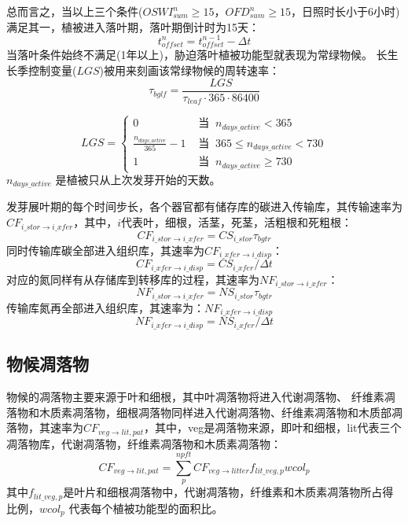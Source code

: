 总而言之，当以上三个条件($OSWI_{sum}^n\geqslant 15$，$OFD_{sum}^n\geqslant 15$，日照时长小于6小时)满足其一，植被进入落叶期，落叶期倒计时为15天：
\begin{equation}
t_{offset}^{n}=t_{offset}^{n-1}-\Delta t
\end{equation}
当落叶条件始终不满足(1年以上)，胁迫落叶植被功能型就表现为常绿物候。
长生长季控制变量($LGS$)被用来刻画该常绿物候的周转速率：
\begin{equation}
\tau_{b g l f}=\frac{L G S}{\tau_{leaf} \cdot 365 \cdot 86400}
\end{equation}

\begin{equation}
L G S=\begin{cases}
0 &  \text{ 当 }\ n_{ {days}\_{active}}<365 \\ 
\frac{n_{ {days\_{active}}}}{365}-1 &  \text{ 当 }\ 365 \leqslant n_{ {days }\_{active} }<730 \\ 
1 & \text{ 当 }\ n_{ {days}\_{active}} \geqslant 730
\end{cases}
\end{equation}
$n_{days\_{active}}$ 是植被只从上次发芽开始的天数。


发芽展叶期的每个时间步长，各个器官都有储存库的碳进入传输库，其传输速率为$CF_{i\_{stor}\rightarrow i\_{xfer}}$，其中，$i$代表叶，细根，活茎，死茎，活粗根和死粗根：
\begin{equation}
CF_{i\_{stor}\rightarrow i\_{xfer}}=CS_{i\_{stor} } \tau_{bgtr}
\end{equation}
同时传输库碳全部进入组织库，其速率为$CF_{i\_{xfer} \rightarrow i\_{disp}}$：
\begin{equation}
  CF_{i\_{xfer}\rightarrow i\_{disp}}=CS_{i\_{xfer}}/\Delta t
\end{equation}
对应的氮同样有从存储库到转移库的过程，其速率为$NF_{i\_{stor}\rightarrow i\_{xfer}}$：
\begin{equation}
  NF_{i\_{stor}\rightarrow i\_{xfer}}=NS_{i\_{stor}}\tau_{bgtr}
\end{equation}
传输库氮再全部进入组织库，其速率为：$NF_{i\_{xfer} \rightarrow i\_{disp}}$
\begin{equation}
  NF_{i\_{xfer}\rightarrow i\_{disp}}=NS_{i\_{xfer}}/\Delta t
\end{equation}


\subsection{物候凋落物}\label{物候凋落物}
物候的凋落物主要来源于叶和细根，其中叶凋落物将进入代谢凋落物、
纤维素凋落物和木质素凋落物，细根凋落物同样进入代谢凋落物、纤维素凋落物和木质部凋落物，其速率为$CF_{veg\rightarrow lit,pat}$，其中，veg是凋落物来源，即叶和细根，lit代表三个凋落物库，代谢凋落物，纤维素凋落物和木质素凋落物：
\begin{equation}
  CF_{veg \rightarrow lit,pat}=\sum_{p}^{npft}{CF_{veg \rightarrow litter}f_{lit\_{veg},p}{wcol_p}}
\end{equation}
其中$f_{lit\_{veg},p}$是叶片和细根凋落物中，代谢凋落物，纤维素和木质素凋落物所占得比例，${wcol_p}$ 代表每个植被功能型的面积比。

